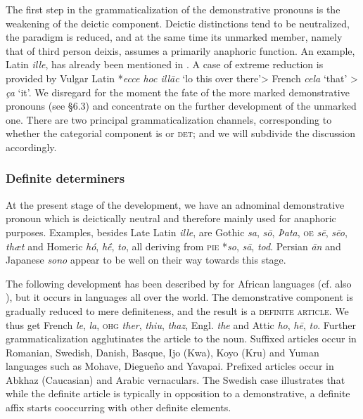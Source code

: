 The first step in the grammaticalization of the demonstrative pronouns is the weakening of the deictic component. Deictic distinctions tend to be neutralized, the paradigm is reduced, and at the same time its unmarked member, namely that of third person deixis, assumes a primarily anaphoric function. An example, Latin \textit{ille}, has already been mentioned in . A case of extreme reduction is provided by Vulgar Latin *\textit{ecce hoc ill\=ac} ‘lo this over there’{\textgreater} French \textit{cela} ‘that’ {\textgreater} \textit{ça} ‘it’. We disregard for the moment the fate of the more marked demonstrative pronouns (see §6.3) and concentrate on the further development of the unmarked one. There are two principal grammaticalization channels, corresponding to whether the categorial component is \np or \textsc{det}; and we will subdivide the discussion accordingly.

\subsubsection{Definite determiners}
At the present stage of the development, we have an adnominal demonstrative pronoun which is deictically neutral and therefore mainly used for anaphoric purposes. Examples, besides Late Latin \textit{ille}, are Gothic \textit{sa}, \textit{s\=o}, \textit{Þata}, \textsc{oe} \textit{s\=e}, \textit{s\=eo}, \textit{thæt} and Homeric \textit{hó}, \textit{h\'{\=e}}, \textit{to}, all deriving from \textsc{pie} *\textit{so}, \textit{s\=a}, \textit{tod}. Persian \textit{\=an} and Japanese \textit{sono} appear to be well on their way towards this stage.

The following development has been described by \citet{Greenberg1978} for African languages (cf. also \citealt[§3]{Givón1978}), but it occurs in languages all over the world. The demonstrative component is gradually reduced to mere definiteness, and the result is a \textsc{definite article}. We thus get French \textit{le}, \textit{la}, \textsc{ohg} \textit{ther}, \textit{thiu}, \textit{thaz}, Engl. \textit{the} and Attic \textit{ho}, \textit{h\=e}, \textit{to}. Further grammaticalization agglutinates the article to the noun. Suffixed articles occur in Romanian, Swedish, Danish, Basque, Ijo (Kwa), Koyo (Kru) and Yuman languages such as Mohave, Diegueño and Yavapai. Prefixed articles occur in Abkhaz (Caucasian) and Arabic vernaculars.\label{page42} The Swedish case illustrates that while the definite article is typically in opposition to a demonstrative, a definite affix starts cooccurring with other definite elements.

